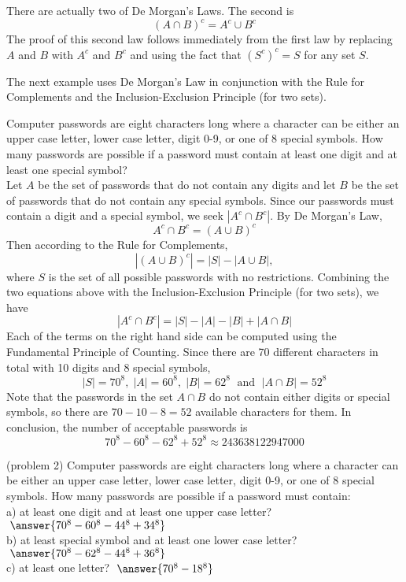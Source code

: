 \documentclass[handout]{ximera}
\begin{document}
\begin{remark}
There are actually two of De Morgan's Laws.  The second is
\[
\left(A \cap B\right)^c = A^c \cup B^c
\]
The proof of this second law follows immediately from the first law by replacing $A$ and $B$ with $A^c$ and $B^c$
and using the fact that $(S^c)^c = S$ for any set $S$.
\end{remark}


The next example uses De Morgan's Law in conjunction with the Rule for Complements and the 
Inclusion-Exclusion Principle (for two sets).

\begin{example}[example 2]
Computer passwords are eight characters long where a character can be either an upper case letter, 
lower case letter, digit 0-9, or one of 8 special symbols. 
How many passwords are possible if a password must contain at least one digit and at least one special symbol?\\

Let $A$ be the set of passwords that do not contain any digits and let $B$ be the set of passwords that do not
contain any special symbols. Since our passwords must contain a digit and a special symbol, we seek $|A^c \cap B^c|$.
By De Morgan's Law, 
\[
A^c \cap B^c = (A \cup B)^c
\]
Then according to the Rule for Complements,
\[
|(A \cup B)^c| = |S| - |A \cup B|,
\]
where $S$ is the set of all possible passwords with no restrictions. 
Combining the two equations above with the Inclusion-Exclusion Principle (for two sets), we have
\[
|A^c \cap B^c| = |S| - |A| - |B| + |A\cap B|
\]
Each of the terms on the right hand side can be computed using the Fundamental Principle of Counting. Since there are
70 different characters in total with 10 digits and 8 special symbols,
\[
|S| = 70^8, \; |A| = 60^8, \; |B| = 62^8 \; \text{ and } \; |A\cap B| = 52^8
\]
Note that the passwords in the set $A \cap B$ do not contain either digits or special symbols, so there are $70-10-8 = 52$
available characters for them. In conclusion, the number of acceptable passwords is
\[
70^8 - 60^8 - 62^8 + 52^8 \approx 243638122947000
\]

\end{example}

\begin{problem}(problem 2)
Computer passwords are eight characters long where a character can be either an upper case letter, 
lower case letter, digit 0-9, or one of 8 special symbols. 
How many passwords are possible if a password must contain:\\
a) at least one digit and at least one upper case letter? $\; \answer{70^8 - 60^8 - 44^8 + 34^8}$\\
b) at least special symbol and at least one lower case letter? $\; \answer{70^8 - 62^8 - 44^8 + 36^8}$\\
c) at least one letter? $\; \answer{70^8 - 18^8}$\\
\end{problem}
\end{document}
